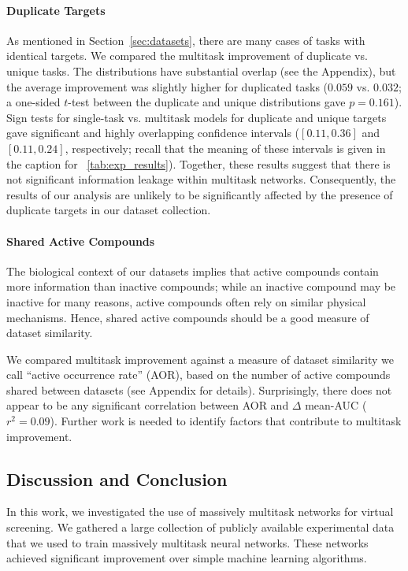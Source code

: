 \paragraph{Duplicate Targets}
\label{sec:duplicates}

As mentioned in Section~\ref{sec:datasets}, there are many cases of tasks
with identical targets. We compared the multitask improvement of duplicate
vs. unique tasks. The distributions have substantial overlap (see the
Appendix), but the average improvement was slightly higher for
duplicated tasks ($0.059$ vs. $0.032$; a one-sided $t$-test between the
duplicate and unique distributions gave $p=0.161$). Sign
tests for single-task vs. multitask models for duplicate and unique
targets gave significant and highly overlapping confidence intervals
($[0.11, 0.36]$ and $[0.11, 0.24]$, respectively; recall that the meaning
of these intervals is given in the caption for
\tablename~\ref{tab:exp_results}). Together, these results suggest that
there is not significant information leakage within multitask networks.
Consequently, the results of our analysis are unlikely to be significantly
affected by the presence of duplicate targets in our dataset collection.

\paragraph{Shared Active Compounds}
\label{sec:similarity}

The biological context of our datasets implies that active compounds
contain more information than inactive compounds; while an inactive
compound may be inactive for many reasons, active compounds often rely on
similar physical mechanisms. Hence, shared active compounds should be a
good measure of dataset similarity.

We compared multitask improvement against a measure of dataset similarity we
call ``active occurrence rate'' (AOR), based on the number of active compounds
shared between datasets (see Appendix for details). Surprisingly, there does
not appear to be any significant correlation between AOR and $\Delta$
mean-AUC ($r^2=0.09$). Further work is needed to identify factors that
contribute to multitask improvement.

\subsection{Discussion and Conclusion}
In this work, we investigated the use of massively multitask networks for
virtual screening. We gathered a large collection of publicly available
experimental data that we used to train massively multitask neural
networks. These networks achieved significant improvement over simple
machine learning algorithms.


